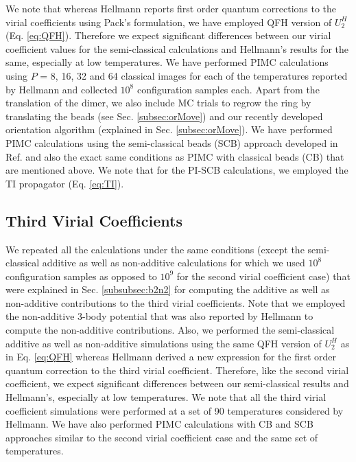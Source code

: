         We note that whereas Hellmann reports first order quantum corrections to the virial coefficients using Pack's \cite{Pack1983} formulation, we have employed QFH version of $U_2^H$ (Eq. \eqref{eq:QFH}). Therefore we expect significant differences between our virial coefficient values for the semi-classical calculations and Hellmann's results for the same, especially at low temperatures. We have performed PIMC calculations using $P$ = 8, 16, 32 and 64 classical images for each of the temperatures reported by Hellmann and collected $10^8$ configuration samples each. Apart from the translation of the dimer, we also include MC trials to regrow the ring by translating the beads (see Sec. \ref{subsec:orMove}) and our recently developed orientation algorithm \cite{hydrogen} (explained in Sec. \ref{subsec:orMove}). We have performed PIMC calculations using the semi-classical beads (SCB) approach developed in Ref. \cite{Fomms2016} and also the exact same conditions as PIMC with classical beads (CB) that are mentioned above. We note that for the PI-SCB calculations, we employed the TI propagator (Eq. \eqref{eq:TI}).

    \subsection{Third Virial Coefficients}
        We repeated all the calculations under the same conditions (except the semi-classical additive as well as non-additive calculations for which we used $10^8$ configuration samples as opposed to $10^9$ for the second virial coefficient case) that were explained in Sec. \ref{subsubsec:b2n2} for computing the additive as well as non-additive contributions to the third virial coefficients. Note that we employed the non-additive 3-body potential that was also reported by Hellmann \cite{Hellmann2013} to compute the non-additive contributions. Also, we performed the semi-classical additive as well as non-additive simulations using the same QFH version of $U_2^H$ as in Eq. \eqref{eq:QFH} whereas Hellmann derived a new expression for the first order quantum correction to the third virial coefficient. Therefore, like the second virial coefficient, we expect significant differences between our semi-classical results and Hellmann's, especially at low temperatures. We note that all the third virial coefficient simulations were performed at a set of 90 temperatures considered by Hellmann. We have also performed PIMC calculations with CB and SCB approaches similar to the second virial coefficient case and the same set of temperatures.

